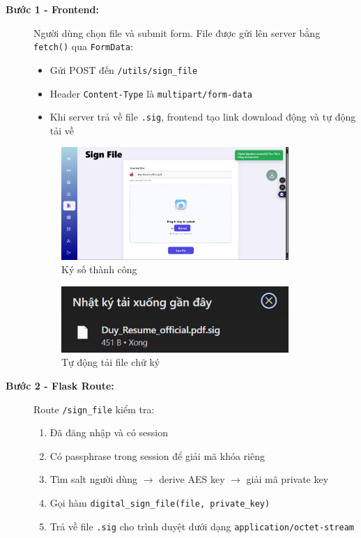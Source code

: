 \begin{description}
    \item[\textbf{Bước 1 - Frontend:}]
    Người dùng chọn file và submit form. File được gửi lên server bằng \texttt{fetch()} qua \texttt{FormData}:
    \begin{itemize}
        \item Gửi POST đến \texttt{/utils/sign\_file}
        \item Header \texttt{Content-Type} là \texttt{multipart/form-data}
        \item Khi server trả về file \texttt{.sig}, frontend tạo link download động và tự động tải về
    \end{itemize}

    \begin{figure}[H]
        \centering
        \includegraphics[width=0.85\textwidth]{img/8_sign/8_sign_success.png}
        \caption{Ký số thành công}
    \end{figure}

    \begin{figure}[H]
        \centering
        \includegraphics[width=0.85\textwidth]{img/8_sign/8_sign_down.png}
        \caption{Tự động tải file chữ ký}
    \end{figure}

    \item[\textbf{Bước 2 - Flask Route:}]
    Route \texttt{/sign\_file} kiểm tra:
    \begin{enumerate}
        \item Đã đăng nhập và có session
        \item Có passphrase trong session để giải mã khóa riêng
        \item Tìm salt người dùng $\rightarrow$ derive AES key $\rightarrow$ giải mã private key
        \item Gọi hàm \texttt{digital\_sign\_file(file, private\_key)}
        \item Trả về file \texttt{.sig} cho trình duyệt dưới dạng \texttt{application/octet-stream}
    \end{enumerate}


\end{description}
